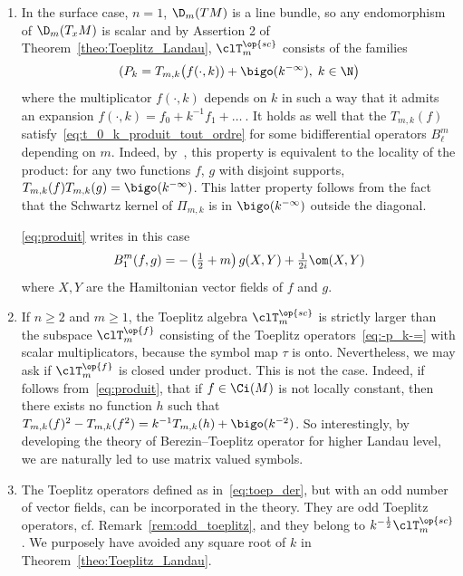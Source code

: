 \break
\begin{rema}\leavevmode \label{rem:Toeplitz}
\begin{enumerate}
\item\label{rema1.4.1} In the surface case, $n=1$, $\D_m(TM)$ is a line bundle, so any endomorphism of $\D_m(T_xM)$ is scalar and by Assertion 2 of Theorem~\ref{theo:Toeplitz_Landau}, $\clT_{m}^{\op{sc}}$ consists of the families
\begin{gather}\label{eq:-p_k-=}
(P_k = T_{m,k} \big(f(\cdot, k)) + \bigo (k^{-\infty}), \; k \in \N\big)
\end{gather}
where the multiplicator $f(\cdot, k)$ depends on $k$ in such a way that it admits an expansion $f(\cdot, k) = f_0 + k^{-1} f_1 + \ldots\ $. It holds as well that the $T_{m,k} (f)$ satisfy~\eqref{eq:t_0_k_produit_tout_ordre} for some bidifferential operators $B_\ell^m$ depending on $m$. Indeed, by~\cite[Section~5.4]{oim}, this property is equivalent to the locality of the product: for any two functions $f$, $g$ with disjoint supports, $T_{m,k} (f) T_{m,k} (g) = \bigo (k^{-\infty})$. This latter property follows from the fact that the Schwartz kernel of $\Pi_{m,k}$ is in $\bigo (k^{-\infty})$ outside the diagonal. 

\eqref{eq:produit} writes in this case
\begin{gather}\label{eq:bm_1-f-g}
B^m_1 (f,g) = - \left(\tfrac{1}{2} +m\right) g(X,Y) + \tfrac{1}{2i} \om (X,Y)
\end{gather}
where $X,Y$ are the Hamiltonian vector fields of $f$ and $g$.

\item\label{rema1.4.2} If $n \geqslant 2$ and $m\geqslant 1$, the Toeplitz algebra $\clT_m^{\op{sc}}$ is strictly larger than the subspace $
\clT_m^{\op{f}}$ consisting of the Toeplitz operators~\eqref{eq:-p_k-=} with scalar multiplicators, because the symbol map $\tau $ is onto. Nevertheless, we may ask if $ \clT_m^{\op{f}}$ is closed under product. This is not the case. Indeed, if follows from~\eqref{eq:produit}, that if $f \in \Ci (M)$ is not locally constant, then there exists no function $h$ such that $T_{m,k} (f)^2 - T_{m,k} (f^2) = k^{-1} T_{m,k} (h) + \bigo (k^{-2})$. So interestingly, by developing the theory of Berezin--Toeplitz operator for higher Landau level, we are naturally led to use matrix valued symbols.
\item\label{rema1.4.3}  The Toeplitz operators defined as in~\eqref{eq:toep_der}, but with an odd number of vector fields, can be incorporated in the theory. They are odd Toeplitz operators, cf. Remark~\ref{rem:odd_toeplitz}, and they belong to $k^{-\frac{1}{2} } \clT_m^{\op{sc}}$. We purposely have avoided any square root of $k$ in Theorem~\ref{theo:Toeplitz_Landau}.
\end{enumerate}
\end{rema}

